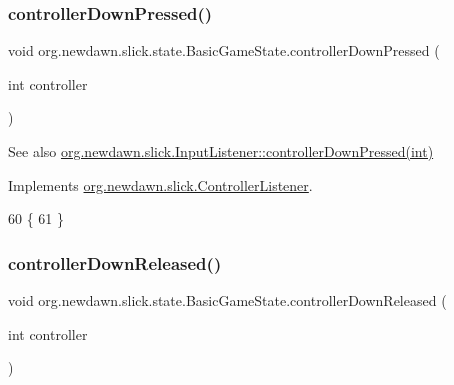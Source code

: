 \subsubsection{\texorpdfstring{controller\+Down\+Pressed()}{controllerDownPressed()}}
{\footnotesize\ttfamily void org.\+newdawn.\+slick.\+state.\+Basic\+Game\+State.\+controller\+Down\+Pressed (\begin{DoxyParamCaption}\item[{int}]{controller }\end{DoxyParamCaption})\hspace{0.3cm}{\ttfamily [inline]}}

\begin{DoxySeeAlso}{See also}
\mbox{\hyperlink{interfaceorg_1_1newdawn_1_1slick_1_1_controller_listener_a9c619e7cb29b3c8b68bc24f9a4e238d7}{org.\+newdawn.\+slick.\+Input\+Listener\+::controller\+Down\+Pressed(int)}} 
\end{DoxySeeAlso}


Implements \mbox{\hyperlink{interfaceorg_1_1newdawn_1_1slick_1_1_controller_listener_a9c619e7cb29b3c8b68bc24f9a4e238d7}{org.\+newdawn.\+slick.\+Controller\+Listener}}.


\begin{DoxyCode}
60                                                       \{
61     \}
\end{DoxyCode}
\mbox{\label{classorg_1_1newdawn_1_1slick_1_1state_1_1_basic_game_state_a8e728a45fed4846429f29299f4dba44f}} 
\subsubsection{\texorpdfstring{controller\+Down\+Released()}{controllerDownReleased()}}
{\footnotesize\ttfamily void org.\+newdawn.\+slick.\+state.\+Basic\+Game\+State.\+controller\+Down\+Released (\begin{DoxyParamCaption}\item[{int}]{controller }\end{DoxyParamCaption})\hspace{0.3cm}{\ttfamily [inline]}}

